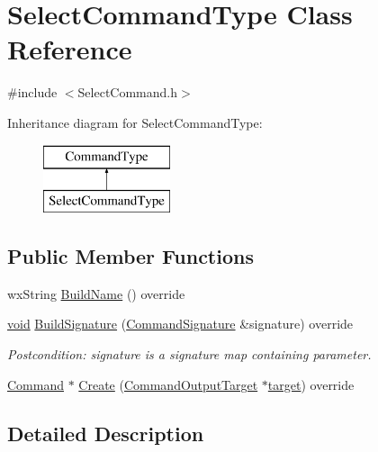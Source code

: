 \hypertarget{class_select_command_type}{}\section{Select\+Command\+Type Class Reference}
\label{class_select_command_type}


{\ttfamily \#include $<$Select\+Command.\+h$>$}

Inheritance diagram for Select\+Command\+Type\+:\begin{figure}[H]
\begin{center}
\leavevmode
\includegraphics[height=2.000000cm]{class_select_command_type}
\end{center}
\end{figure}
\subsection*{Public Member Functions}
\begin{DoxyCompactItemize}
\item 
wx\+String \hyperlink{class_select_command_type_adca4b4ef9309f42b2e586ed8c6e6e9b2}{Build\+Name} () override
\item 
\hyperlink{sound_8c_ae35f5844602719cf66324f4de2a658b3}{void} \hyperlink{class_select_command_type_a313c63870d7c811507679e55eeaaf7eb}{Build\+Signature} (\hyperlink{class_command_signature}{Command\+Signature} \&signature) override
\begin{DoxyCompactList}\small\item\em Postcondition\+: signature is a \textquotesingle{}signature\textquotesingle{} map containing parameter. \end{DoxyCompactList}\item 
\hyperlink{class_command}{Command} $\ast$ \hyperlink{class_select_command_type_a49d90817900a7ba1840bfa6aece4228e}{Create} (\hyperlink{class_command_output_target}{Command\+Output\+Target} $\ast$\hyperlink{lib_2expat_8h_a15a257516a87decb971420e718853137}{target}) override
\end{DoxyCompactItemize}


\subsection{Detailed Description}


